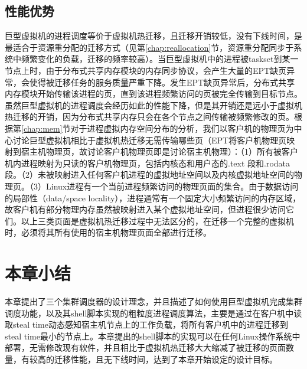 \subsection{性能优势}
巨型虚拟机的进程调度等价于虚拟机热迁移，且迁移开销较低，没有下线时间，是最适合于资源重分配的迁移方式（见第\ref{chap:reallocation}节，资源重分配同步于系统中频繁变化的负载，迁移的频率较高）。当巨型虚拟机中的进程被taskset到某一节点上时，由于分布式共享内存模块的内存同步协议，会产生大量的EPT缺页异常，会使得被迁移任务的服务质量严重下降。发生EPT缺页异常后，分布式共享内存模块开始传输该进程的页，直到该进程频繁访问的页被完全传输到目标节点。虽然巨型虚拟机的进程调度会经历如此的性能下降，但是其开销还是远小于虚拟机热迁移的开销，因为分布式共享内存只会在各个节点之间传输被频繁修改的页。根据第\ref{chap:mem}节对于进程虚拟内存空间分布的分析，我们以客户机的物理页为中心讨论巨型虚拟机相比于虚拟机热迁移无需传输哪些页（EPT将客户机物理页映射到宿主机物理页，故讨论客户机物理页即是讨论宿主机物理）：（1）所有被客户机内进程映射为只读的客户机物理页，包括内核态和用户态的.text 段和.rodata段。（2）未被映射进入任何客户机进程的虚拟地址空间以及内核虚拟地址空间的物理页。（3）Linux进程有一个当前进程频繁访问的物理页面的集合。由于数据访问的局部性（data/space locality），进程通常有一个固定大小频繁访问的内存区域，故客户机有部分物理内存虽然被映射进入某个虚拟地址空间，但进程很少访问它们。以上三类页面是虚拟机热迁移过程中无法区分的，在迁移一个完整的虚拟机时，必须将其所有使用的宿主机物理页面全部进行迁移。

\section{本章小结}
本章提出了三个集群调度器的设计理念，并且描述了如何使用巨型虚拟机完成集群调度功能，以及其shell脚本实现的粗粒度进程调度算法，主要是通过在客户机中读取steal time动态感知宿主机节点上的工作负载，将所有客户机中的进程迁移到steal time最小的节点上。本章提出的shell脚本的实现可以在任何Linux操作系统中部署，无需修改现有软件，并且相比于虚拟机热迁移大大缩减了被迁移的页面数量，有较高的迁移性能，且无下线时间，达到了本章开始设定的设计目标。